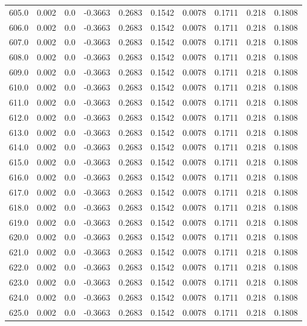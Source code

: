 \begin{longtable}{lrrrrrrrrr}
605.0 & 0.002 & 0.0 & -0.3663 & 0.2683 & 0.1542 & 0.0078 & 0.1711 & 0.218 & 0.1808 \\
606.0 & 0.002 & 0.0 & -0.3663 & 0.2683 & 0.1542 & 0.0078 & 0.1711 & 0.218 & 0.1808 \\
607.0 & 0.002 & 0.0 & -0.3663 & 0.2683 & 0.1542 & 0.0078 & 0.1711 & 0.218 & 0.1808 \\
608.0 & 0.002 & 0.0 & -0.3663 & 0.2683 & 0.1542 & 0.0078 & 0.1711 & 0.218 & 0.1808 \\
609.0 & 0.002 & 0.0 & -0.3663 & 0.2683 & 0.1542 & 0.0078 & 0.1711 & 0.218 & 0.1808 \\
610.0 & 0.002 & 0.0 & -0.3663 & 0.2683 & 0.1542 & 0.0078 & 0.1711 & 0.218 & 0.1808 \\
611.0 & 0.002 & 0.0 & -0.3663 & 0.2683 & 0.1542 & 0.0078 & 0.1711 & 0.218 & 0.1808 \\
612.0 & 0.002 & 0.0 & -0.3663 & 0.2683 & 0.1542 & 0.0078 & 0.1711 & 0.218 & 0.1808 \\
613.0 & 0.002 & 0.0 & -0.3663 & 0.2683 & 0.1542 & 0.0078 & 0.1711 & 0.218 & 0.1808 \\
614.0 & 0.002 & 0.0 & -0.3663 & 0.2683 & 0.1542 & 0.0078 & 0.1711 & 0.218 & 0.1808 \\
615.0 & 0.002 & 0.0 & -0.3663 & 0.2683 & 0.1542 & 0.0078 & 0.1711 & 0.218 & 0.1808 \\
616.0 & 0.002 & 0.0 & -0.3663 & 0.2683 & 0.1542 & 0.0078 & 0.1711 & 0.218 & 0.1808 \\
617.0 & 0.002 & 0.0 & -0.3663 & 0.2683 & 0.1542 & 0.0078 & 0.1711 & 0.218 & 0.1808 \\
618.0 & 0.002 & 0.0 & -0.3663 & 0.2683 & 0.1542 & 0.0078 & 0.1711 & 0.218 & 0.1808 \\
619.0 & 0.002 & 0.0 & -0.3663 & 0.2683 & 0.1542 & 0.0078 & 0.1711 & 0.218 & 0.1808 \\
620.0 & 0.002 & 0.0 & -0.3663 & 0.2683 & 0.1542 & 0.0078 & 0.1711 & 0.218 & 0.1808 \\
621.0 & 0.002 & 0.0 & -0.3663 & 0.2683 & 0.1542 & 0.0078 & 0.1711 & 0.218 & 0.1808 \\
622.0 & 0.002 & 0.0 & -0.3663 & 0.2683 & 0.1542 & 0.0078 & 0.1711 & 0.218 & 0.1808 \\
623.0 & 0.002 & 0.0 & -0.3663 & 0.2683 & 0.1542 & 0.0078 & 0.1711 & 0.218 & 0.1808 \\
624.0 & 0.002 & 0.0 & -0.3663 & 0.2683 & 0.1542 & 0.0078 & 0.1711 & 0.218 & 0.1808 \\
625.0 & 0.002 & 0.0 & -0.3663 & 0.2683 & 0.1542 & 0.0078 & 0.1711 & 0.218 & 0.1808 \\

\end{longtable}
